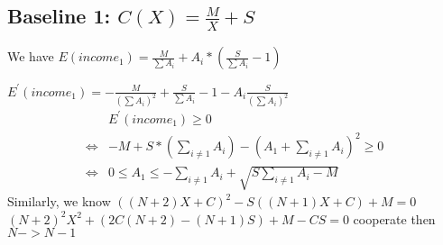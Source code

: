 \documentclass{article}
\begin{document}
\subsection{Baseline 1: $C(X)=\frac{M}{X}+S$}
We have $E(income_1)=\frac{M}{\sum A_i}+A_i*(\frac{S}{\sum A_i}-1)$
\par $E^{'}(income_1)= -\frac{M}{(\sum A_i)^2}+\frac{S}{\sum A_i}-1-A_i\frac{S}{(\sum A_i)^2}$
 \begin{equation}
\begin{aligned}
&E^{'}(income_1)\ge 0
\\\Longleftrightarrow&-M+S*(\sum_{i\ne 1}A_i)-(A_1+\sum_{i\ne 1}A_i)^2\ge 0
\\\Longleftrightarrow& 0 \le A_1 \le -\sum_{i\ne 1} A_i+\sqrt{S\sum_{i\ne 1} A_i-M}
\end{aligned}
\end{equation}
Similarly, we know 
$((N+2)X+C)^2-S((N+1)X+C)+M=0$
$(N+2)^2X^2+(2C(N+2)-(N+1)S)+M-CS=0$
cooperate then
$N->N-1$
\end{document}
